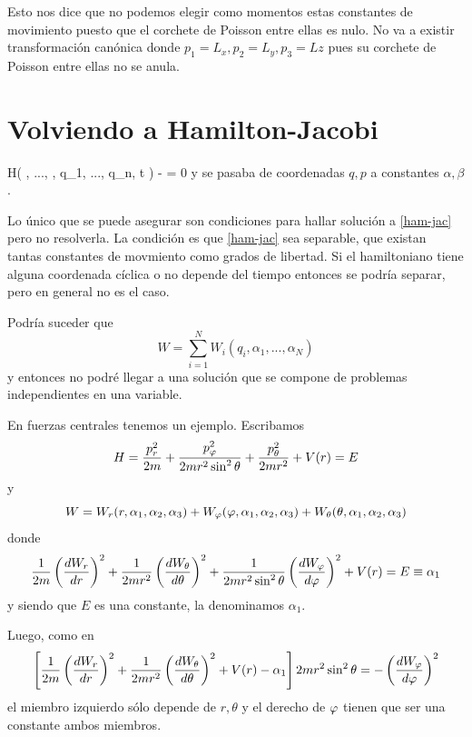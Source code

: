 \documentclass[10pt,oneside]{CBFT_book}
\begin{document}
Esto nos dice que no podemos elegir como momentos estas constantes de movimiento puesto que el
corchete de Poisson entre ellas es nulo.
No va a existir transformación canónica donde $p_1 = L_x, p_2 = L_y, p_3 = Lz$ pues su corchete de
Poisson entre ellas no se anula.

\section{Volviendo a Hamilton-Jacobi}

\be
	H\left( , ..., , q_1, ..., q_n, t \right) -  = 0
	\label{ham-jac}
\ee
y se pasaba de coordenadas $q,p$ a constantes $\alpha,\beta$.

Lo único que se puede asegurar son condiciones para hallar solución a \eqref{ham-jac} pero no resolverla.
La condición es que \eqref{ham-jac} sea separable, que existan tantas constantes de movmiento como grados
de libertad. Si el hamiltoniano tiene alguna coordenada cíclica o no depende del tiempo entonces se podría
separar, pero en general no es el caso.

Podría suceder que
\[
	W = \sum_{i=1}^N W_i(q_i,\alpha_1,...,\alpha_N)
\]
y entonces no podré llegar a una solución que se compone de problemas independientes en una variable.

En fuerzas centrales tenemos un ejemplo. Escribamos
\[
	H = \frac{p_r^2}{2m} + \frac{p_\varphi^2}{2mr^2\sin^2\theta} + \frac{p_\theta^2}{2mr^2} + V(r) = E
\]
y
\[
	W = W_r(r,\alpha_1,\alpha_2,\alpha_3) + W_\varphi(\varphi,\alpha_1,\alpha_2,\alpha_3) + 
		W_\theta(\theta,\alpha_1,\alpha_2,\alpha_3)
\]
donde
\[
	\frac{1}{2m} \left( \frac{d^{\hspace{-0.05em}} {W_r}}{d {r}^{\hspace{-0.05em}}} \right)^2 + \frac{1}{2mr^2} \left( \frac{d^{\hspace{-0.05em}} {W_\theta}}{d {\theta}^{\hspace{-0.05em}}} \right)^2 + \frac{1}{2mr^2\sin^2\theta} \left( \frac{d^{\hspace{-0.05em}} {W_\varphi}}{d {\varphi}^{\hspace{-0.05em}}} \right)^2
	+ V(r)  = E \equiv \alpha_1
\]
y siendo que $E$ es una constante, la denominamos $\alpha_1$.

Luego, como en 
\[
	\left[\frac{1}{2m} \left( \frac{d^{\hspace{-0.05em}} {W_r}}{d {r}^{\hspace{-0.05em}}} \right)^2 + \frac{1}{2mr^2} \left( \frac{d^{\hspace{-0.05em}} {W_\theta}}{d {\theta}^{\hspace{-0.05em}}} \right)^2 + V(r) - \alpha_1 \right] 
	2 m r^2 \sin^2\theta = - \left( \frac{d^{\hspace{-0.05em}} {W_\varphi}}{d {\varphi}^{\hspace{-0.05em}}} \right)^2
\]
el miembro izquierdo sólo depende de $r,\theta$ y el derecho de $\varphi$ tienen que ser una constante ambos
miembros.
\end{document}
